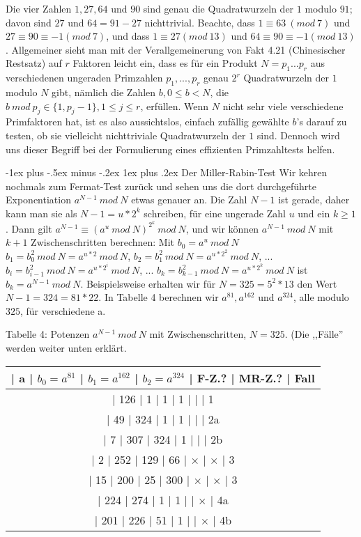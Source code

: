 \documentclass[a4paper]{article}
\makeatletter
\renewcommand{\subsubsection}{\@startsection{subsubsection}{3}{0mm}%
 {-1ex plus -.5ex minus -.2ex}%
 {1ex plus .2ex}%
 {\normalfont\small\bfseries}}
\makeatother
\begin{document}
\begin{multicols}{3}
        Die vier Zahlen $1, 27, 64$ und $90$ sind genau die Quadratwurzeln der $1$ modulo $91$; davon sind $27$ und $64 = 91-27$ nichttrivial. Beachte, dass $1\equiv 63\ (mod\ 7)$ und $27\equiv 90 \equiv -1(mod\ 7)$, und dass $1\equiv 27 (mod\ 13)$ und $64\equiv 90 \equiv -1 (mod\ 13)$. Allgemeiner sieht man mit der Verallgemeinerung von Fakt 4.21 (Chinesischer Restsatz) auf $r$ Faktoren leicht ein, dass es für ein Produkt $N=p_1...p_r$ aus verschiedenen ungeraden Primzahlen $p_1,...,p_r$ genau $2^r$ Quadratwurzeln der $1$ modulo $N$ gibt, nämlich die Zahlen $b,0\leq b < N$, die $b\ mod\ p_j\in\{1 ,p_j-1\}, 1\leq j\leq r$, erfüllen. Wenn $N$ nicht sehr viele verschiedene Primfaktoren hat, ist es also aussichtslos, einfach zufällig gewählte $b$’s darauf zu testen, ob sie vielleicht nichttriviale Quadratwurzeln der $1$ sind. Dennoch wird uns dieser Begriff bei der Formulierung eines effizienten Primzahltests helfen.

        \subsubsection{Der Miller-Rabin-Test}
        Wir kehren nochmals zum Fermat-Test zurück und sehen uns die dort durchgeführte Exponentiation $a^{N-1}\ mod\ N$ etwas genauer an. Die Zahl $N-1$ ist gerade, daher kann man sie als $N-1=u*2^k$ schreiben, für eine ungerade Zahl $u$ und ein $k\geq 1$. Dann gilt $a^{N-1} \equiv (a^u\ mod\ N)^{2^k}\ mod\ N$, und wir können $a^{N-1}\ mod\ N$ mit $k+1$ Zwischenschritten berechnen: Mit
    $b_0 =a^u\ mod\ N$
    $b_1 =b^2_0\ mod\ N=a^{u*2}\ mod\ N$,
    $b_2 =b^2_1\ mod\ N=a^{u*2^2}\ mod\ N$,
        ...
    $b_i=b^2_{i-1}\ mod\ N=a^{u*2^i}\ mod\ N$,
        ...
    $b_k=b^2_{k-1}\ mod\ N=a^{u*2^k}\ mod\ N$
        ist $b_k=a^{N-1}\ mod\ N$. Beispielsweise erhalten wir für $N=325 = 5^2 *13$ den Wert $N-1 = 324 = 81* 22$. In Tabelle 4 berechnen wir $a^{81} ,a^{162}$ und $a^{324}$, alle modulo $325$, für verschiedene a.

        Tabelle 4: Potenzen $a^{N-1}\ mod\ N$ mit Zwischenschritten, $N=325$. (Die ,,Fälle'' werden weiter unten erklärt.
        \begin{tabular}{c}
        | a  | $b_0 =a^{81}$ | $b_1=a^{162}$ | $b_2=a^{324}$ | F-Z.?  | MR-Z.?  | Fall \\\hline
        | 126 | 1       | 1       | 1       |     |     | 1  \\
        | 49 | 324      | 1       | 1       |     |     | 2a  \\
        | 7  | 307      | 324      | 1       |     |     | 2b  \\
        | 2  | 252      | 129      | 66      | $\times$ | $\times$ | 3  \\
        | 15 | 200      | 25      | 300      | $\times$ | $\times$ | 3  \\
        | 224 | 274      | 1       | 1       |     | $\times$ | 4a  \\
        | 201 | 226      | 51      | 1       |     | $\times$ | 4b  
        \end{tabular}


\end{multicols}
\end{document}
